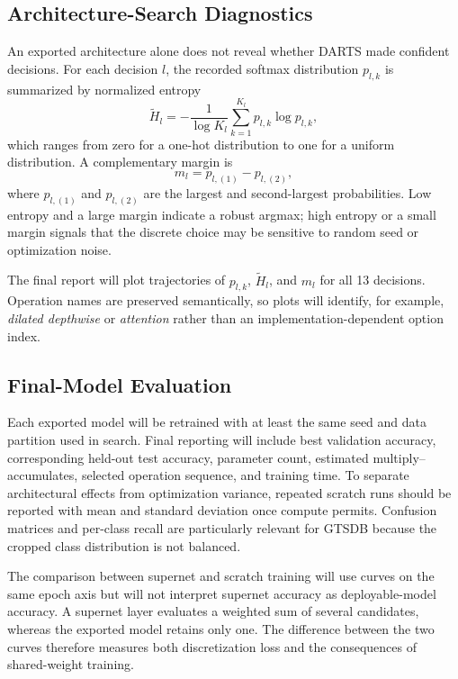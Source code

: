 \documentclass[lettersize,journal]{IEEEtran}
\begin{document}
\subsection{Architecture-Search Diagnostics}
An exported architecture alone does not reveal whether DARTS made confident decisions. For each decision $l$, the recorded softmax distribution $p_{l,k}$ is summarized by normalized entropy
\begin{equation}
\tilde{H}_l=-\frac{1}{\log K_l}\sum_{k=1}^{K_l}p_{l,k}\log p_{l,k},
\label{eq:entropy}
\end{equation}
which ranges from zero for a one-hot distribution to one for a uniform distribution. A complementary margin is
\begin{equation}
m_l=p_{l,(1)}-p_{l,(2)},
\end{equation}
where $p_{l,(1)}$ and $p_{l,(2)}$ are the largest and second-largest probabilities. Low entropy and a large margin indicate a robust argmax; high entropy or a small margin signals that the discrete choice may be sensitive to random seed or optimization noise.

The final report will plot trajectories of $p_{l,k}$, $\tilde{H}_l$, and $m_l$ for all 13 decisions. Operation names are preserved semantically, so plots will identify, for example, \emph{dilated depthwise} or \emph{attention} rather than an implementation-dependent option index.

\subsection{Final-Model Evaluation}
Each exported model will be retrained with at least the same seed and data partition used in search. Final reporting will include best validation accuracy, corresponding held-out test accuracy, parameter count, estimated multiply--accumulates, selected operation sequence, and training time. To separate architectural effects from optimization variance, repeated scratch runs should be reported with mean and standard deviation once compute permits. Confusion matrices and per-class recall are particularly relevant for GTSDB because the cropped class distribution is not balanced.

The comparison between supernet and scratch training will use curves on the same epoch axis but will not interpret supernet accuracy as deployable-model accuracy. A supernet layer evaluates a weighted sum of several candidates, whereas the exported model retains only one. The difference between the two curves therefore measures both discretization loss and the consequences of shared-weight training.
\end{document}
